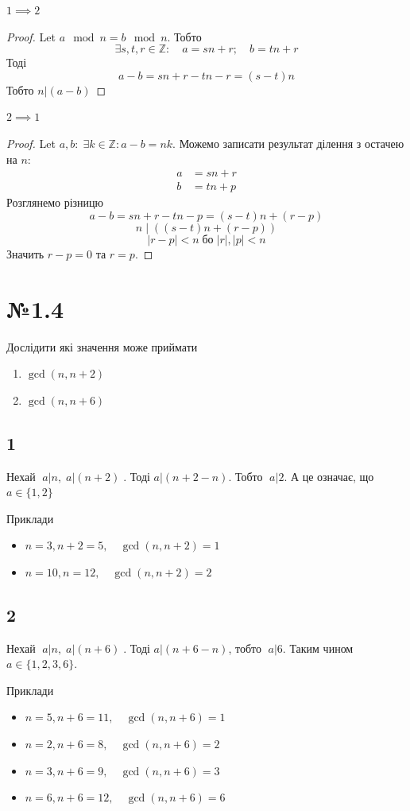 \documentclass[11pt, a4paper]{article} %
\newcommand{\Z}{\mathbb{Z}}
\begin{document}
$1 \implies 2$
\begin{proof}
    Let $a \mod n = b \mod n$. Тобто
    \[\exists s,t,r\in\Z: \quad a = sn + r; \quad b = tn + r\]
    Тоді
    \[a-b = sn + r - tn - r = (s-t)n\]
    Тобто $n|(a-b)$
\end{proof}
\newpage
$2 \implies 1$
\begin{proof}
    Let $a,b: \; \exists k\in\Z: a-b = nk$.
    Можемо записати результат ділення з остачею на $n$:
    \begin{align*}
        a &= sn + r \\
        b &= tn + p
    \end{align*}
    Розглянемо різницю
    \[a-b = sn+r - tn - p = (s-t)n + (r-p)\]
    \[n\;|\;\left((s-t)n + (r-p)\right)\]
    \[|r-p| < n \;\text{бо}\; |r|,|p|<n\]
    Значить $r-p=0$ та $r=p$.
\end{proof}


\section*{№1.4}
\begin{mdframed}
    Дослідити які значення може приймати
    \begin{enumerate}
        \item $\gcd(n,n+2)$
        \item $\gcd(n,n+6)$
    \end{enumerate}
\end{mdframed}

\subsection*{1}
Нехай $\;a|n, \; a|(n+2)\;$. Тоді $a|(n+2-n)$. Тобто $\;a|2$.
А це означає, що $a \in \{1, 2\}$

Приклади
\begin{itemize}
    \item $n=3, n+2=5, \quad \gcd(n,n+2) = 1$
    \item $n=10, n=12, \quad \gcd(n,n+2) = 2$
\end{itemize}

\subsection*{2}
Нехай $\;a|n,\; a|(n+6)\;$. Тоді $a|(n+6-n)$, тобто $\;a|6$.
Таким чином $a \in \{1,2,3,6\}$.

Приклади
\begin{itemize}
    \item $n=5, n+6=11, \quad \gcd(n,n+6) = 1$
    \item $n=2, n+6=8, \quad \gcd(n,n+6) = 2$
    \item $n=3, n+6=9, \quad \gcd(n,n+6) = 3$
    \item $n=6, n+6=12, \quad \gcd(n,n+6) = 6$
\end{itemize}
\end{document}
